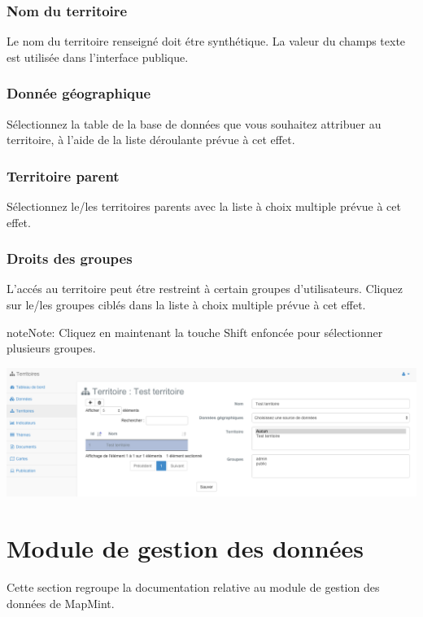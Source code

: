 \documentclass[letterpaper,10pt,french]{sphinxmanual}
\begin{document}
\subsection{Nom du territoire}
\label{territories/infopanel:nom-du-territoire}
Le nom du territoire renseigné doit étre synthétique. La valeur du champs texte est utilisée dans l'interface publique.


\subsection{Donnée géographique}
\label{territories/infopanel:donnee-geographique}
Sélectionnez la table de la base de données que vous souhaitez attribuer au territoire, à l'aide de la liste déroulante prévue à cet effet.


\subsection{Territoire parent}
\label{territories/infopanel:territoire-parent}
Sélectionnez le/les territoires parents avec la liste à choix multiple prévue à cet effet.


\subsection{Droits des groupes}
\label{territories/infopanel:droits-des-groupes}
L'accés au territoire peut étre restreint à certain groupes d'utilisateurs. Cliquez sur le/les groupes ciblés dans la liste à choix multiple prévue à cet effet.

\begin{notice}{note}{Note:}
Cliquez en maintenant la touche Shift enfoncée pour sélectionner plusieurs groupes.
\end{notice}

\includegraphics[width=1.000\linewidth]{territory-module-preview.png}


\chapter{Module de gestion des données}
\label{data/index:data}\label{data/index::doc}\label{data/index:module-de-gestion-des-donnees}
Cette section regroupe la documentation relative au module de gestion des données de MapMint.
\end{document}

